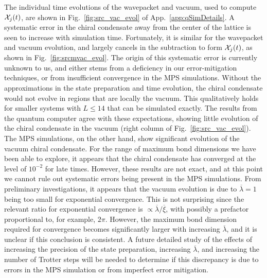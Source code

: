 \documentclass[aps, prc, tightenlines,superscriptaddress, letterpaper, amsmath, amssymb, preprintnumbers, floatfix, longbibliography, nofootinbib]{revtex4-2}
\begin{document}
The individual time evolutions of the wavepacket and vacuum, used to compute ${\cal X}_j(t)$, are shown in Fig.~\ref{fig:src_vac_evol} of App.~\ref{app:qSimDetails}.
A systematic error in the chiral condensate away from the center of the lattice is seen to increase with simulation time.
Fortunately, it is similar for the wavepacket and vacuum evolution, and largely cancels in the subtraction to form ${\cal X}_j(t)$, as shown in Fig.~\ref{fig:srcmvac_evol}.
The origin of this systematic error is currently unknown to us, and either stems from a deficiency in our error-mitigation techniques, or from insufficient convergence in the MPS simulations.
Without the approximations in the state preparation and time evolution, the chiral condensate would not evolve in regions that are locally the vacuum.
This qualitatively holds for smaller systems with $L\leq 14$ that can be simulated exactly.
The results from the quantum computer agree with these expectations, showing little evolution of the chiral condensate in the vacuum (right column of Fig.~\ref{fig:src_vac_evol}).
The MPS simulations, on the other hand, show significant evolution of the vacuum chiral condensate.
For the range of maximum bond dimensions we have been able to explore, it appears that the chiral condensate has converged at the level of $10^{-2}$ for late times.
However, these results are not exact, and at this point we cannot rule out systematic errors being present in the MPS simulations.
From preliminary investigations, it appears that the vacuum evolution is due to $\overline{\lambda}=1$ being too small for exponential convergence.
This is not surprising since the relevant ratio for exponential convergence is $\propto \overline{\lambda}/\overline{\xi}$, with possibly a prefactor proportional to, for example, $2\pi$.
However, the maximum bond dimension required for convergence becomes significantly larger with increasing $\overline{\lambda}$, and it is unclear if this conclusion is consistent.
A future detailed study of the effects of increasing the precision of the state preparation, increasing $\overline{\lambda}$, and increasing the number of Trotter steps will be needed to determine if this discrepancy is due to errors in the MPS simulation or from imperfect error mitigation.
\end{document}
